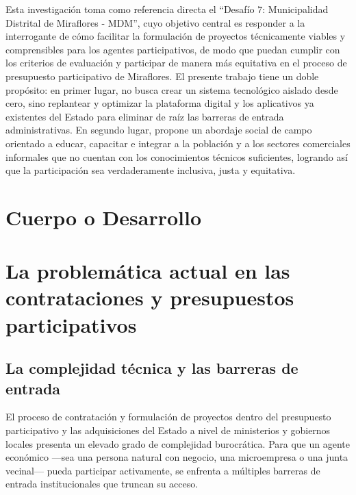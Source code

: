 \documentclass[12pt,a4paper]{article}
\begin{document}
Esta investigación toma como referencia directa el ``Desafío 7: Municipalidad Distrital de Miraflores - MDM'', cuyo objetivo central es responder a la interrogante de cómo facilitar la formulación de proyectos técnicamente viables y comprensibles para los agentes participativos, de modo que puedan cumplir con los criterios de evaluación y participar de manera más equitativa en el proceso de presupuesto participativo de Miraflores. El presente trabajo tiene un doble propósito: en primer lugar, no busca crear un sistema tecnológico aislado desde cero, sino replantear y optimizar la plataforma digital y los aplicativos ya existentes del Estado para eliminar de raíz las barreras de entrada administrativas. En segundo lugar, propone un abordaje social de campo orientado a educar, capacitar e integrar a la población y a los sectores comerciales informales que no cuentan con los conocimientos técnicos suficientes, logrando así que la participación sea verdaderamente inclusiva, justa y equitativa.

\newpage

\section*{Cuerpo o Desarrollo}

\section{La problemática actual en las contrataciones y presupuestos participativos}

\subsection{La complejidad técnica y las barreras de entrada}
El proceso de contratación y formulación de proyectos dentro del presupuesto participativo y las adquisiciones del Estado a nivel de ministerios y gobiernos locales presenta un elevado grado de complejidad burocrática. Para que un agente económico ---sea una persona natural con negocio, una microempresa o una junta vecinal--- pueda participar activamente, se enfrenta a múltiples barreras de entrada institucionales que truncan su acceso.
\end{document}
